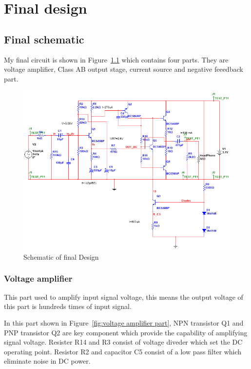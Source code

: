 \chapter{Final design}

\section{Final schematic}

My final circuit is shown in Figure~\ref{fig:final schematic} which contains four parts. They are voltage amplifier, Class AB output stage, current source and negative feeedback part.



\begin{figure}[htbp]
	\centering
	\includegraphics[scale=0.7]{"../Photo/Chap5/final schematic"}
	\caption{Schematic of final Design }
	\label{fig:final schematic}
\end{figure}


\subsection{Voltage amplifier}  

This part used to amplify input signal voltage, this means the output voltage of this part is hundreds times of input signal.


In this part shown in Figure~\ref{fig:voltage amplifier part}, NPN transistor Q1 and PNP transistor Q2 are key component which provide the capability of amplifying signal voltage. Resister R14 and R3 consist of voltage diveder which set the DC operating point. Resistor R2 and capacitor C5 consist of a low pass filter which eliminate noise in DC power.

